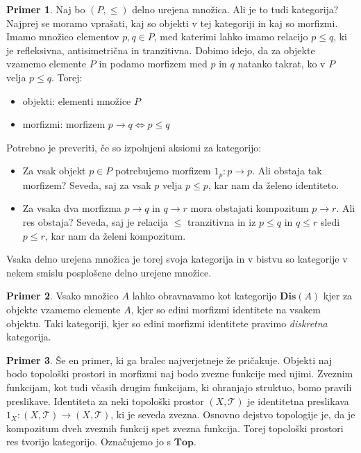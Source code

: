 \documentclass[12pt,a4paper]{book}
\theoremstyle{definition}
\theoremstyle{plain}
\theoremstyle{definition}
\newtheorem{primer}{Primer}[section]
\theoremstyle{remark}
\newcommand{\cat}[1]{\textbf{#1}}
\begin{document}
\begin{primer}
Naj bo $(P, \leq)$ delno urejena množica. Ali je to tudi kategorija? Najprej se moramo vprašati, kaj so objekti v tej kategoriji in kaj so morfizmi.
Imamo množico elementov $p,q \in P$, med katerimi lahko imamo relacijo $p \leq q$, ki je refleksivna, antisimetrična in tranzitivna. Dobimo idejo, da za objekte vzamemo elemente $P$ in podamo morfizem med $p$ in $q$ natanko takrat, ko v $P$ velja $p \leq q$.
Torej: 
\begin{itemize}
\item objekti: elementi množice $P$
\item morfizmi: morfizem $p \rightarrow q \Leftrightarrow p \leq q$
\end{itemize}
Potrebno je preveriti, če so izpolnjeni aksiomi za kategorijo:

\begin{itemize}
\item Za vsak objekt $p \in P$ potrebujemo morfizem $1_p : p \to p$. Ali obstaja tak morfizem? Seveda, saj za vsak $p$ velja $p \leq p$, kar nam da želeno identiteto.
\item Za vsaka dva morfizma $p \to q$ in $q \to r$ mora obstajati kompozitum $p \to r$. Ali res obstaja? Seveda, saj je relacija $\leq$ tranzitivna in iz $p \leq q$ in $q \leq r$ sledi $p \leq r$, kar nam da želeni kompozitum.
\end{itemize}
Vsaka delno urejena množica je torej svoja kategorija in v bistvu so kategorije v nekem smislu posplošene delno urejene množice.
\end{primer}



\begin{primer}
Vsako množico $A$ lahko obravnavamo kot kategorijo $\cat{Dis}(A)$ kjer za objekte vzamemo elemente $A$, kjer so edini morfizmi identitete na vsakem objektu. Taki kategoriji, kjer so edini morfizmi identitete pravimo \emph{diskretna} kategorija.
\end{primer}

\begin{primer}
Še en primer, ki ga bralec najverjetneje že pričakuje. Objekti naj bodo topološki prostori in morfizmi naj bodo zvezne funkcije med njimi. Zveznim funkcijam, kot tudi včasih drugim funkcijam, ki ohranjajo struktuo, bomo pravili preslikave. Identiteta za neki topološki prostor $(X, \mathcal{T})$ je identitetna preslikava $1_X : (X, \mathcal{T}) \to (X, \mathcal{T})$, ki je seveda zvezna. Osnovno dejstvo topologije je, da je kompozitum dveh zveznih funkcij spet zvezna funkcija. Torej topološki prostori res tvorijo kategorijo. Označujemo jo s $\cat{Top}$.
\end{primer}
\end{document}
